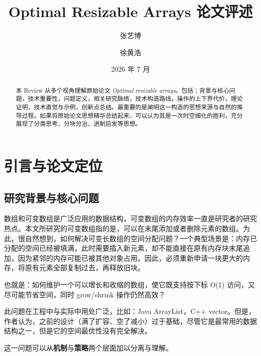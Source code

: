 \documentclass[12pt,a4paper]{article}
\title{\textbf{Optimal Resizable Arrays 论文评述}}
\author{张艺博 \and 徐黄浩}
\date{2026 年 7 月}
\begin{document}
\maketitle

\begin{abstract}

本 Review 从多个视角理解原始论文 \emph{Optimal resizable arrays}。包括：背景与核心问题，技术重要性，问题定义，相关研究脉络，技术构造路线，操作的上下界代价，理论证明，技术直觉与示例，创新点总结。最重要的是阐明这一构造的思想来源与自然的推导过程。如果将原始论文思想精华总结起来，可以认为其是一次时空细化的胜利，充分展现了分类思考、分块分治、进制启发等思想。

\end{abstract}

\newpage
\tableofcontents
\newpage

\section{引言与论文定位}

\subsection{研究背景与核心问题}

数组和可变数组是广泛应用的数据结构，可变数组的内存效率一直是研究者的研究热点。本文所研究的可变数组指的是，可以在末尾添加或者删除元素的数组\cite{tarjan2023optimalresizablearrays}。为此，很自然想到，如何解决可变长数组的空间分配问题？一个典型场景是：内存已分配的空间已经被填满，此时需要插入新元素，却不能直接在原有内存块末尾追加，因为紧邻的内存可能已被其他对象占用。因此，必须重新申请一块更大的内存，将原有元素全部复制过去，再释放旧块。

也就是：如何维护一个可以增长和收缩的数组，使它既支持按下标 O(1) 访问，又尽可能节省空间，同时 grow/shrink 操作仍然高效？

此问题在工程中与实际中用处广泛，比如：Java ArrayList，C++ vector。但是，作者认为，之前的设计（满了扩容、空了减小）过于基础，尽管它是最常用的数据结构之一，但是它的空间最优性没有完全解决。

这一问题可以从\textbf{机制}与\textbf{策略}两个层面加以分离与理解。
\end{document}
